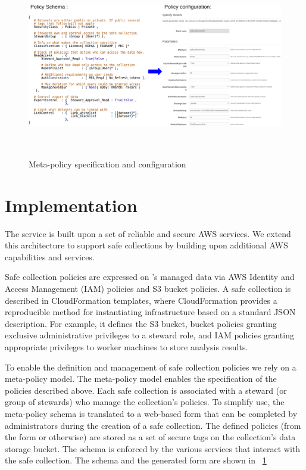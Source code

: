 \begin{figure}%
  \center
  \includegraphics[width=\textwidth, height=8cm]{figures/meta-policy.png}
  \caption{Meta-policy specification and configuration}
  \vspace{-1.5em}
  \label{fig:schema}
\end{figure}

\section{Implementation}

The \NAME service is built upon a set of reliable and secure
AWS services. We extend this architecture to support safe collections
by building upon additional AWS capabilities and services.

Safe collection policies are expressed on \NAME's managed
data via AWS Identity and Access Management (IAM) policies
and S3 bucket policies.
A safe collection is described in CloudFormation templates, where
CloudFormation provides a reproducible method for instantiating infrastructure
based on a standard JSON description. For example, it defines
the S3 bucket, bucket policies granting exclusive administrative privileges to a steward role,
and IAM policies granting appropriate privileges to \NAME worker machines to store analysis results.

To enable the definition and management of safe collection policies we
rely on a meta-policy model. The meta-policy model enables the specification
of the policies described above. Each safe collection is associated with a steward
(or group of stewards) who manage the collection's policies. To simplify use, the meta-policy schema
is translated to a web-based form that can be completed by administrators during the creation of a safe collection.
The defined policies (from the form or otherwise) are stored as a set of secure tags
on the collection's data storage bucket. The schema is enforced by the various services that interact
with the safe collection. The schema and the generated form are shown in \figurename~\ref{fig:schema}

